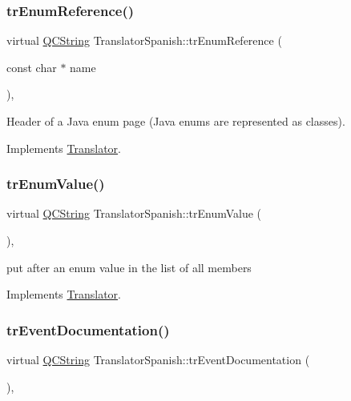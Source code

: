\subsubsection{\texorpdfstring{trEnumReference()}{trEnumReference()}}
{\footnotesize\ttfamily virtual \mbox{\hyperlink{class_q_c_string}{Q\+C\+String}} Translator\+Spanish\+::tr\+Enum\+Reference (\begin{DoxyParamCaption}\item[{const char $\ast$}]{name }\end{DoxyParamCaption})\hspace{0.3cm}{\ttfamily [inline]}, {\ttfamily [virtual]}}

Header of a Java enum page (Java enums are represented as classes). 

Implements \mbox{\hyperlink{class_translator}{Translator}}.

\mbox{\label{class_translator_spanish_a3b9e880f8c83b27182db1c18b07a7cf4}} 
\subsubsection{\texorpdfstring{trEnumValue()}{trEnumValue()}}
{\footnotesize\ttfamily virtual \mbox{\hyperlink{class_q_c_string}{Q\+C\+String}} Translator\+Spanish\+::tr\+Enum\+Value (\begin{DoxyParamCaption}{ }\end{DoxyParamCaption})\hspace{0.3cm}{\ttfamily [inline]}, {\ttfamily [virtual]}}

put after an enum value in the list of all members 

Implements \mbox{\hyperlink{class_translator}{Translator}}.

\mbox{\label{class_translator_spanish_adabcf117bddafac427a2211e5e08bc44}} 
\subsubsection{\texorpdfstring{trEventDocumentation()}{trEventDocumentation()}}
{\footnotesize\ttfamily virtual \mbox{\hyperlink{class_q_c_string}{Q\+C\+String}} Translator\+Spanish\+::tr\+Event\+Documentation (\begin{DoxyParamCaption}{ }\end{DoxyParamCaption})\hspace{0.3cm}{\ttfamily [inline]}, {\ttfamily [virtual]}}

